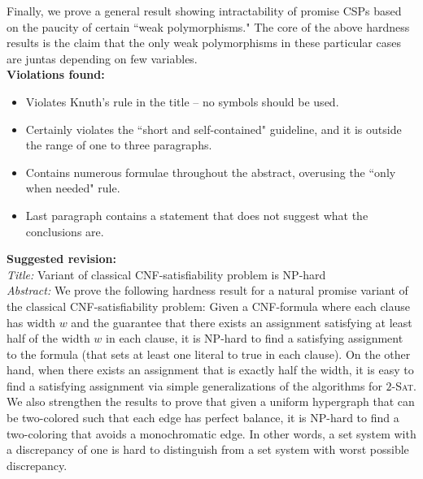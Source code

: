 \documentclass[11pt]{article}
\begin{document}
Finally, we prove a general result showing intractability of promise CSPs based on the paucity of certain ``weak polymorphisms." The core of the above hardness results is the claim that the only weak polymorphisms in these particular cases are juntas depending on few variables.\\

\textbf{Violations found:}

\begin{itemize}
    \item Violates Knuth's rule in the title -- no symbols should be used.
    \item Certainly violates the ``short and self-contained" guideline, and it is outside the range of one to three paragraphs.
    \item Contains numerous formulae throughout the abstract, overusing the ``only when needed" rule.
    \item Last paragraph contains a statement that does not suggest what the conclusions are.
\end{itemize}

\textbf{Suggested revision:}\\

\textit{Title:} Variant of classical CNF-satisfiability problem is NP-hard\\

\textit{Abstract:} We prove the following hardness result for a natural promise variant of the classical CNF-satisfiability problem: Given a CNF-formula where each clause has width $w$ and the guarantee that there exists an assignment satisfying at least half of the width $w$ in each clause, it is NP-hard to find a satisfying assignment to the formula (that sets at least one literal to true in each clause). On the other hand, when there exists an assignment that is exactly half the width, it is easy to find a satisfying assignment via simple generalizations of the algorithms for \textsc{$2$-Sat}.\\

We also strengthen the results to prove that given a uniform hypergraph that can be two-colored such that each edge has perfect balance, it is NP-hard to find a two-coloring that avoids a monochromatic edge. In other words, a set system with a discrepancy of one is hard to distinguish from a set system with worst possible discrepancy.\\\\
\end{document}
